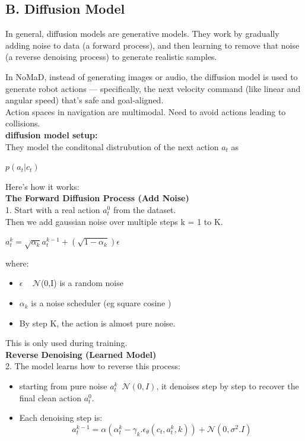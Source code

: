 \documentclass[12pt]{article}
\begin{document}
\subsection*{B. Diffusion Model}
In general, diffusion models are generative models.
They work by gradually adding noise to data (a forward process), and then learning to remove that noise (a reverse denoising process) to generate realistic samples.

In NoMaD, instead of generating images or audio, the diffusion model is used to generate robot actions — specifically, the next velocity command (like linear and angular speed) that’s safe and goal-aligned.\\

Action spaces in navigation are multimodal. Need to avoid actions leading to collisions.\\
\textbf{diffusion model setup:}\\
They model the conditonal distrubution of the next action $a_t$ as\\
\begin{center}
    $p(a_t|c_t)$
\end{center}
Here's how it works:\\
\textbf{The Forward Diffusion Process (Add Noise)}\\
1. Start with a real action $a^{0}_t$  from the dataset.\\
Then we add gaussian noise over multiple steps k = 1 to K.\\
\begin{center}
    $a^{k}_t = \sqrt{\alpha_k} a^{k-1}_t + (\sqrt{1 - \alpha_k}) \epsilon$
\end{center}
where:\\
\begin{itemize}
    \item $\epsilon$ ~ $\mathcal{N}$(0,I) is a random noise
    \item $\alpha_k$ is a noise scheduler (eg square cosine )
    \item By step K, the action is almost pure noise.
\end{itemize}
This is only used during training.\\
\textbf{Reverse Denoising (Learned Model)}\\
2. The model learns how to reverse this process:\\
\begin{itemize}
    \item starting from pure noise $a^{k}_t$~$\mathcal{N}(0,I)$, it denoises step by step to recover the final clean action $a^{0}_t$.
    \item Each denoising step is:
    \[ 
    a^{k-1}_t = \alpha(\alpha^{k}_t-\gamma_k.\epsilon_{\theta}(c_t, a^{k}_t,k)) + \mathcal{N}(0,\sigma^2.I)
    \]
\end{itemize}
\end{document}
